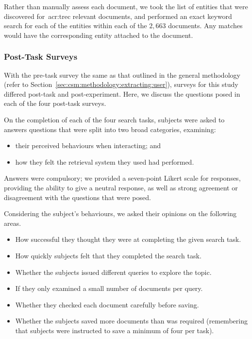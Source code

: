 Rather than manually assess each document, we took the list of entities that were discovered for~\gls{acr:trec} relevant documents, and performed an exact keyword search for each of the entities within each of the $2,663$ documents. Any matches would have the corresponding entity attached to the document.

\subsubsection{Post-Task Surveys}
With the pre-task survey the same as that outlined in the general methodology (refer to Section~\ref{sec:csm:methodology:extracting:user}), surveys for this study differed post-task and post-experiment. Here, we discuss the questions posed in each of the four post-task surveys.

On the completion of each of the four search tasks, subjects were asked to answers questions that were split into two broad categories, examining:

\begin{itemize}
    \item{their perceived behaviours when interacting; and}
    \item{how they felt the retrieval system they used had performed.}
\end{itemize}

Answers were compulsory; we provided a seven-point Likert scale for responses, providing the ability to give a neutral response, as well as strong agreement or disagreement with the questions that were posed.

Considering the subject's behaviours, we asked their opinions on the following areas.

\begin{itemize}
    \item{ How successful they thought they were at completing the given search task.}
    \item{ How quickly subjects felt that they completed the search task.}
    \item{ Whether the subjects issued different queries to explore the topic.}
    \item{ If they only examined a small number of documents per query.}
    \item{ Whether they checked each document carefully before saving.}
    \item{ Whether the subjects saved more documents than was required (remembering that subjects were instructed to save a minimum of four per task).}
\end{itemize}

